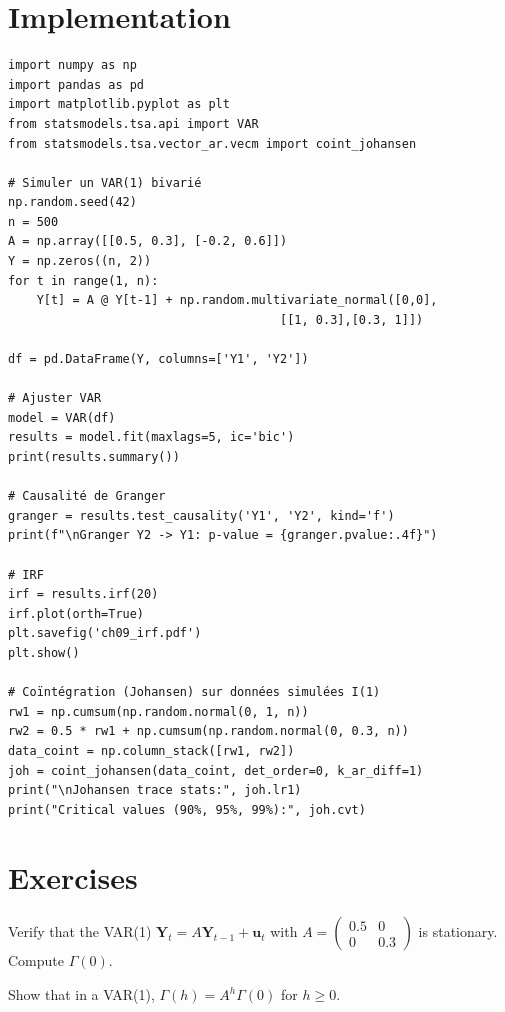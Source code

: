 \section{Implementation}

\begin{codeblock}[title=\textbf{Python}]
\begin{verbatim}
import numpy as np
import pandas as pd
import matplotlib.pyplot as plt
from statsmodels.tsa.api import VAR
from statsmodels.tsa.vector_ar.vecm import coint_johansen

# Simuler un VAR(1) bivarié
np.random.seed(42)
n = 500
A = np.array([[0.5, 0.3], [-0.2, 0.6]])
Y = np.zeros((n, 2))
for t in range(1, n):
    Y[t] = A @ Y[t-1] + np.random.multivariate_normal([0,0],
                                      [[1, 0.3],[0.3, 1]])

df = pd.DataFrame(Y, columns=['Y1', 'Y2'])

# Ajuster VAR
model = VAR(df)
results = model.fit(maxlags=5, ic='bic')
print(results.summary())

# Causalité de Granger
granger = results.test_causality('Y1', 'Y2', kind='f')
print(f"\nGranger Y2 -> Y1: p-value = {granger.pvalue:.4f}")

# IRF
irf = results.irf(20)
irf.plot(orth=True)
plt.savefig('ch09_irf.pdf')
plt.show()

# Coïntégration (Johansen) sur données simulées I(1)
rw1 = np.cumsum(np.random.normal(0, 1, n))
rw2 = 0.5 * rw1 + np.cumsum(np.random.normal(0, 0.3, n))
data_coint = np.column_stack([rw1, rw2])
joh = coint_johansen(data_coint, det_order=0, k_ar_diff=1)
print("\nJohansen trace stats:", joh.lr1)
print("Critical values (90%, 95%, 99%):", joh.cvt)
\end{verbatim}
\end{codeblock}

\section{Exercises}

\begin{exercise}[$\star$]
Verify that the VAR(1) $\bm{Y}_t = A\bm{Y}_{t-1}+\bm{u}_t$ with $A=\begin{pmatrix}0.5&0\\0&0.3\end{pmatrix}$ is stationary. Compute $\Gamma(0)$.
\end{exercise}

\begin{exercise}[$\star\star$]
Show that in a VAR(1), $\Gamma(h)=A^h\Gamma(0)$ for $h\geq 0$.
\end{exercise}


